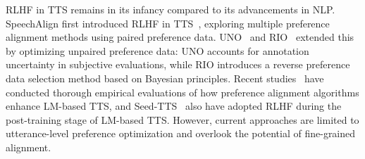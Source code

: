 RLHF in TTS remains in its infancy compared to its advancements in NLP. SpeechAlign first introduced RLHF in TTS~\citep{zhang2024speechalign}, exploring multiple preference alignment methods using paired preference data. UNO~\citep{chen2024uno} and RIO~\citep{hu2024rio} extended this by optimizing unpaired preference data: UNO accounts for annotation uncertainty in subjective evaluations, while RIO introduces a reverse preference data selection method based on Bayesian principles. Recent studies~\citep{tian2024tx_rl} have conducted thorough empirical evaluations of how preference alignment algorithms enhance LM-based TTS, and Seed-TTS~\citep{anastassiou2024seedtts} also have adopted RLHF during the post-training stage of LM-based TTS. However, current approaches are limited to utterance-level preference optimization and overlook the potential of fine-grained alignment.